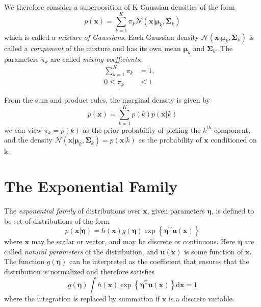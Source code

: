 \documentclass[5p,sort&compress]{elsarticle}
\begin{document}
We therefore consider a superposition of K Gaussian densities of the form
\begin{equation}
p(\mathbf{x})=\sum_{k=1}^{K} \pi_{k} \mathcal{N}\left(\mathbf{x} | \boldsymbol{\mu}_{k}, \mathbf{\Sigma}_{k}\right)
\end{equation}
which is called a \textit{mixture of Gaussians}. Each Gaussian density $\mathcal{N}(\mathbf{x} | \boldsymbol{\mu}_{k}, \mathbf{\Sigma}_{k})$ is called a \textit{component} of the mixture and has its own mean $\boldsymbol{\mu}_{k}$ and $\mathbf{\Sigma}_{k}$. The parameters $\pi_k$ are called \textit{mixing coefficients}.
\begin{equation}
\begin{aligned} \sum_{k=1}^{K} \pi_{k} &=1 , &  \\ 0 \leqslant \pi_{k} & \leqslant 1 \end{aligned}
\end{equation}

From the sum and product rules, the marginal density is given by 
\begin{equation}
p(\mathbf{x})=\sum_{k=1}^{K} p(k) p(\mathbf{x} | k)
\end{equation}
we can view $\pi_k = p(k)$ as the prior probability of picking the $k^{th}$ component, and the density $\mathcal{N}(\mathbf{x} | \boldsymbol{\mu}_{k}, \mathbf{\Sigma}_{k}) = p(\mathbf{x} | k)$ as the probability of $\boldsymbol{x}$ conditioned on k.



\section{The Exponential Family}

The \textit{exponential family} of distributions over $\boldsymbol{x}$, given parameters $\boldsymbol{\eta}$, is defined to be set of distributions of the form
\begin{equation}
p(\mathbf{x} | \boldsymbol{\eta})=h(\mathbf{x}) g(\boldsymbol{\eta}) \exp \left\{\boldsymbol{\eta}^{\mathrm{T}} \mathbf{u}(\mathbf{x})\right\}
\end{equation}
where $\boldsymbol{x}$ may be scalar or vector, and may be discrete or continuous. Here $\boldsymbol{\eta}$ are called \textit{natural parameters} of the distribution, and $\mathbf{u}(\mathbf{x})$ is some function of $\mathbf{x}$. The function $g(\mathbf{\eta})$ can be interpreted as the coefficient that ensures that the distribution is normalized and therefore satisfies
\begin{equation}
g(\boldsymbol{\eta}) \int h(\mathbf{x}) \exp \left\{\boldsymbol{\eta}^{\mathrm{T}} \mathbf{u}(\mathbf{x})\right\} \mathrm{d} \mathbf{x}=1
\end{equation}
where the integration is replaced by summation if $\mathbf{x}$ is a discrete variable.
\end{document}
